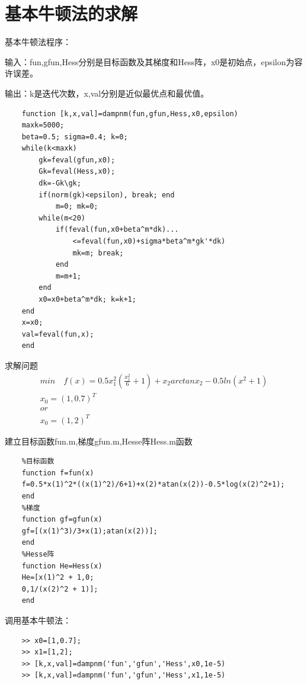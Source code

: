 \documentclass[12pt]{article} %
\begin{document}
	\section{基本牛顿法的求解}
	基本牛顿法程序：
	
	输入：fun,gfun,Hess分别是目标函数及其梯度和Hess阵，x0是初始点，epsilon为容许误差。
	
	输出：k是迭代次数，x,val分别是近似最优点和最优值。
	\begin{lstlisting}
	function [k,x,val]=dampnm(fun,gfun,Hess,x0,epsilon)
	maxk=5000; 
	beta=0.5; sigma=0.4; k=0;
	while(k<maxk)
		gk=feval(gfun,x0); 
		Gk=feval(Hess,x0); 
		dk=-Gk\gk; 
		if(norm(gk)<epsilon), break; end 
			m=0; mk=0;
		while(m<20) 
			if(feval(fun,x0+beta^m*dk)...
				<=feval(fun,x0)+sigma*beta^m*gk'*dk)
				mk=m; break;
			end
			m=m+1;
		end
		x0=x0+beta^m*dk; k=k+1;
	end
	x=x0;
	val=feval(fun,x);
	end
	\end{lstlisting}
	
	求解问题
	\begin{gather*}
	min\quad f(x)=0.5x_1^2(\frac{x_1^2}{6}+1)+x_2arctanx_2-0.5ln(x^2+1)\\
	x_0=(1,0.7)^T\\
	or\\
	x_0=(1,2)^T
	\end{gather*}

	建立目标函数fun.m,梯度gfun.m,Hesse阵Hess.m函数
	\begin{lstlisting}
	%目标函数
	function f=fun(x)
	f=0.5*x(1)^2*((x(1)^2)/6+1)+x(2)*atan(x(2))-0.5*log(x(2)^2+1);
	end
	%梯度
	function gf=gfun(x)
	gf=[(x(1)^3)/3+x(1);atan(x(2))];
	end
	%Hesse阵
	function He=Hess(x)
	He=[x(1)^2 + 1,0;
	0,1/(x(2)^2 + 1)];
	end
	\end{lstlisting}

	调用基本牛顿法：
	\begin{lstlisting}
	>> x0=[1,0.7];
	>> x1=[1,2];
	>> [k,x,val]=dampnm('fun','gfun','Hess',x0,1e-5)
	>> [k,x,val]=dampnm('fun','gfun','Hess',x1,1e-5)
	\end{lstlisting}
	
\end{document}
